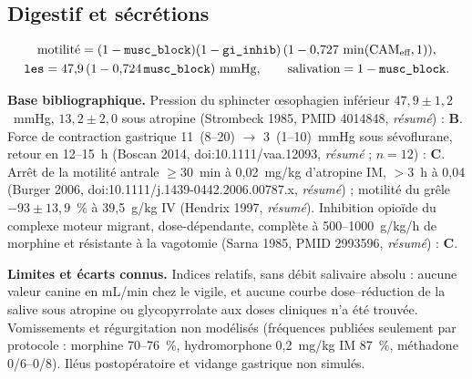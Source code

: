 \documentclass[10pt,a4paper]{article}
\newcommand{\vp}[1]{\text{\texttt{\detokenize{#1}}}}
\newcommand{\evB}{\textcolor{green!45!black}{\textbf{B}}}
\newcommand{\evC}{\textcolor{orange!80!black}{\textbf{C}}}
\newcommand{\acc}[1]{\textsl{#1}}
\newcommand{\limite}[1]{\par\textbf{Limites et écarts connus.} #1}
\newcommand{\sources}[1]{\par\textbf{Base bibliographique.} #1}
\begin{document}
\subsection{Digestif et sécrétions}
\begin{gather}
\text{motilité} = (1 - \vp{musc_block})(1 - \vp{gi_inhib})\,(1 - 0{,}727\,\min(\text{CAM}_\text{eff}, 1)),\\
\vp{les} = 47{,}9\,(1 - 0{,}724\,\vp{musc_block})~\text{mmHg},\qquad \text{salivation} = 1 - \vp{musc_block}.
\end{gather}
\sources{Pression du sphincter œsophagien inférieur $47{,}9 \pm 1{,}2$~mmHg, $13{,}2 \pm 2{,}0$ sous
atropine (Strombeck 1985, PMID 4014848, \acc{résumé}) : \evB{}. Force de contraction gastrique
11~(8--20) $\to$ 3~(1--10)~mmHg sous sévoflurane, retour en 12--15~h (Boscan 2014,
doi:10.1111/vaa.12093, \acc{résumé} ; $n = 12$) : \evC{}. Arrêt de la motilité antrale $\geq 30$~min
à 0,02~mg/kg d'atropine IM, $> 3$~h à 0,04 (Burger 2006, doi:10.1111/j.1439-0442.2006.00787.x,
\acc{résumé}) ; motilité du grêle $-93 \pm 13{,}9$~\% à 39,5~\textmu g/kg IV (Hendrix 1997,
\acc{résumé}). Inhibition opioïde du complexe moteur migrant, dose-dépendante, complète à
500--1000~\textmu g/kg/h de morphine et résistante à la vagotomie (Sarna 1985, PMID 2993596,
\acc{résumé}) : \evC{}.}
\limite{Indices relatifs, sans débit salivaire absolu : aucune valeur canine en mL/min chez le
vigile, et aucune courbe dose--réduction de la salive sous atropine ou glycopyrrolate aux doses
cliniques n'a été trouvée. Vomissements et régurgitation non modélisés (fréquences publiées
seulement par protocole : morphine 70--76~\%, hydromorphone 0,2~mg/kg IM 87~\%, méthadone
0/6--0/8). Iléus postopératoire et vidange gastrique non simulés.}
\end{document}
